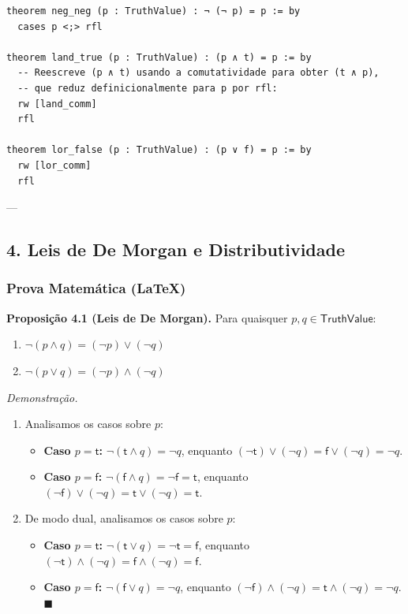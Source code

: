 \documentclass[11pt,a4paper]{scrartcl}
\begin{document}
\begin{lstlisting}[language=lean4,numbers=none]
theorem neg_neg (p : TruthValue) : ¬ (¬ p) = p := by
  cases p <;> rfl

theorem land_true (p : TruthValue) : (p ∧ t) = p := by
  -- Reescreve (p ∧ t) usando a comutatividade para obter (t ∧ p),
  -- que reduz definicionalmente para p por rfl:
  rw [land_comm]
  rfl

theorem lor_false (p : TruthValue) : (p ∨ f) = p := by
  rw [lor_comm]
  rfl
\end{lstlisting}

---
\subsection{4. Leis de De Morgan e Distributividade}
\label{sec:orgbc00f59}

\subsubsection{Prova Matemática (\LaTeX{})}
\label{sec:orgfcadb87}
\textbf{Proposição 4.1 (Leis de De Morgan).} Para quaisquer \(p, q \in \mathsf{TruthValue}\):
\begin{enumerate}
\item \(\neg(p \land q) = (\neg p) \lor (\neg q)\)
\item \(\neg(p \lor q) = (\neg p) \land (\neg q)\)
\end{enumerate}

\emph{Demonstração.}
\begin{enumerate}
\item Analisamos os casos sobre \(p\):
\begin{itemize}
\item \textbf{Caso \(p = \mathsf{t}\):} \(\neg(\mathsf{t} \land q) = \neg q\), enquanto \((\neg \mathsf{t}) \lor (\neg q) = \mathsf{f} \lor (\neg q) = \neg q\).
\item \textbf{Caso \(p = \mathsf{f}\):} \(\neg(\mathsf{f} \land q) = \neg \mathsf{f} = \mathsf{t}\), enquanto \((\neg \mathsf{f}) \lor (\neg q) = \mathsf{t} \lor (\neg q) = \mathsf{t}\).
\end{itemize}
\item De modo dual, analisamos os casos sobre \(p\):
\begin{itemize}
\item \textbf{Caso \(p = \mathsf{t}\):} \(\neg(\mathsf{t} \lor q) = \neg \mathsf{t} = \mathsf{f}\), enquanto \((\neg \mathsf{t}) \land (\neg q) = \mathsf{f} \land (\neg q) = \mathsf{f}\).
\item \textbf{Caso \(p = \mathsf{f}\):} \(\neg(\mathsf{f} \lor q) = \neg q\), enquanto \((\neg \mathsf{f}) \land (\neg q) = \mathsf{t} \land (\neg q) = \neg q\). \(\blacksquare\)
\end{itemize}
\end{enumerate}
\end{document}
